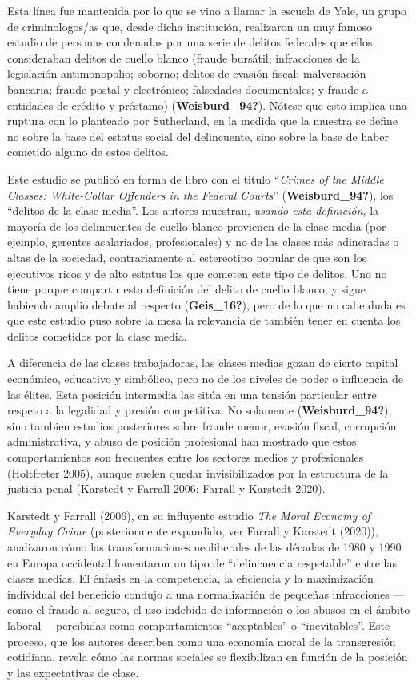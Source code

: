 \documentclass[
  spanish,
  letterpaper,
  DIV=11,
  numbers=noendperiod]{scrreprt}
\begin{document}
Esta línea fue mantenida por lo que se vino a llamar la escuela de Yale,
un grupo de criminologos/as que, desde dicha institución, realizaron un
muy famoso estudio de personas condenadas por una serie de delitos
federales que ellos consideraban delitos de cuello blanco (fraude
bursátil; infracciones de la legislación antimonopolio; soborno; delitos
de evasión fiscal; malversación bancaria; fraude postal y electrónico;
falsedades documentales; y fraude a entidades de crédito y préstamo)
(\textbf{Weisburd\_94?}). Nótese que esto implica una ruptura con lo
planteado por Sutherland, en la medida que la muestra se define no sobre
la base del estatus social del delincuente, sino sobre la base de haber
cometido alguno de estos delitos.

Este estudio se publicó en forma de libro con el titulo ``\emph{Crimes
of the Middle Classes: White-Collar Offenders in the Federal Courts}''
(\textbf{Weisburd\_94?}), los ``delitos de la clase media''. Los autores
muestran, \emph{usando esta definición}, la mayoría de los delincuentes
de cuello blanco provienen de la clase media (por ejemplo, gerentes
asalariados, profesionales) y no de las clases más adineradas o altas de
la sociedad, contrariamente al estereotipo popular de que son los
ejecutivos ricos y de alto estatus los que cometen este tipo de delitos.
Uno no tiene porque compartir esta definición del delito de cuello
blanco, y sigue habiendo amplio debate al respecto (\textbf{Geis\_16?}),
pero de lo que no cabe duda es que este estudio puso sobre la mesa la
relevancia de también tener en cuenta los delitos cometidos por la clase
media.

A diferencia de las clases trabajadoras, las clases medias gozan de
cierto capital económico, educativo y simbólico, pero no de los niveles
de poder o influencia de las élites. Esta posición intermedia las sitúa
en una tensión particular entre respeto a la legalidad y presión
competitiva. No solamente (\textbf{Weisburd\_94?}), sino tambien
estudios posteriores sobre fraude menor, evasión fiscal, corrupción
administrativa, y abuso de posición profesional han mostrado que estos
comportamientos son frecuentes entre los sectores medios y profesionales
(Holtfreter 2005), aunque suelen quedar invisibilizados por la
estructura de la justicia penal (Karstedt y Farrall 2006; Farrall y
Karstedt 2020).

Karstedt y Farrall (2006), en su influyente estudio \emph{The Moral
Economy of Everyday Crime} (posteriormente expandido, ver Farrall y
Karstedt (2020)), analizaron cómo las transformaciones neoliberales de
las décadas de 1980 y 1990 en Europa occidental fomentaron un tipo de
``delincuencia respetable'' entre las clases medias. El énfasis en la
competencia, la eficiencia y la maximización individual del beneficio
condujo a una normalización de pequeñas infracciones ---como el fraude
al seguro, el uso indebido de información o los abusos en el ámbito
laboral--- percibidas como comportamientos ``aceptables'' o
``inevitables''. Este proceso, que los autores describen como una
economía moral de la transgresión cotidiana, revela cómo las normas
sociales se flexibilizan en función de la posición y las expectativas de
clase.
\end{document}
